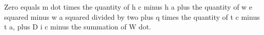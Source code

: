Zero equals m dot times the quantity of h c minus h a plus the quantity of w e squared minus w a squared divided by two plus q times the quantity of t c minus t a, plus D i c minus the summation of W dot.